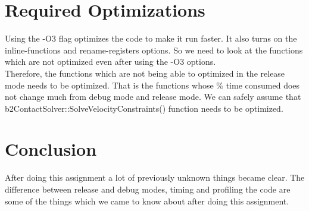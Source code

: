 \documentclass [11pt]{report}
\begin{document}
\section{Required Optimizations}
Using the -O3 flag optimizes the code to make it run faster. It also turns on the inline-functions and rename-registers options. So we need to look at the functions which are not optimized even after using the -O3 options.\\

Therefore, the functions which are not being able to optimized in the release mode needs to be optimized. That is the functions whose \% time consumed does not change much from debug mode and release mode. We can safely assume that b2ContactSolver::SolveVelocityConstraints() function needs to be optimized.

\section{Conclusion}
After doing this assignment a lot of previously unknown things became clear.
The difference between release and debug modes, timing and profiling the code are some of the things which we came to know about after doing this assignment.

\end{document}
